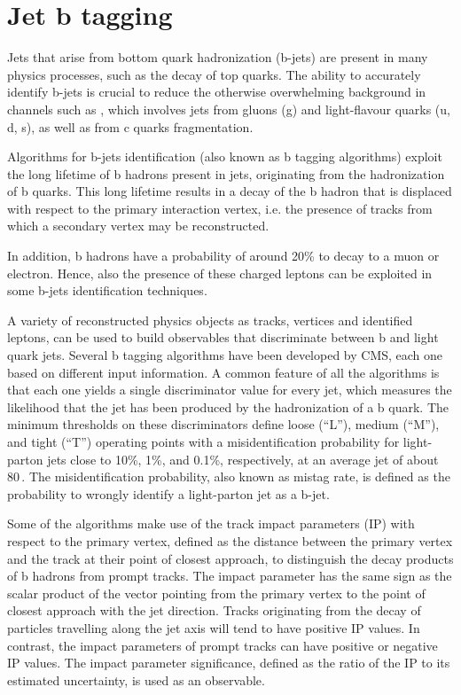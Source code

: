 \section{Jet b tagging}\label{sec:btag}

Jets that arise from bottom quark hadronization (b-jets) are present in many physics processes,
such as the decay of top quarks. The ability to accurately identify b-jets is crucial to reduce the otherwise overwhelming background in channels such as \hwwllnn, which involves jets from gluons (g) and light-flavour quarks (u, d, s), as well as from c quarks fragmentation.

Algorithms for b-jets identification (also known as b tagging algorithms) exploit the long lifetime of b hadrons present in jets, originating from the hadronization of b quarks. This long lifetime results in a decay of the b hadron that is displaced with respect to the primary interaction vertex, i.e. the presence of tracks from which a secondary vertex may be reconstructed. 

In addition, b hadrons have a probability of around 20\% to decay to a muon or electron. Hence, also the presence of these charged leptons can be exploited in some b-jets identification techniques.

A variety of reconstructed physics objects as tracks, vertices and identified leptons, can be used to build observables that discriminate between b and light quark jets. Several b tagging algorithms have been developed by CMS, each one based on different input information. A common feature of all the algorithms is that each one yields a single discriminator value for every jet, which measures the likelihood that the jet has been produced by the hadronization of a b quark. The minimum thresholds on these discriminators define loose (``L''), medium (``M''), and tight (``T'') operating points with a misidentification probability for light-parton jets close to 10\%, 1\%, and 0.1\%, respectively, at an average jet \pt of about 80\,\GeV. The misidentification probability, also known as mistag rate, is defined as the probability to wrongly identify a light-parton jet as a b-jet.

Some of the algorithms make use of the track impact parameters (IP) with respect to the primary vertex, defined as the distance between the primary vertex and the track at their point of closest approach, to distinguish the decay products of b hadrons from prompt tracks. The impact parameter has the same sign as the scalar product of the vector pointing from the primary vertex to the point of closest approach with the jet direction. Tracks originating from the decay of particles travelling along the jet axis will tend to have positive IP values. In contrast, the impact parameters of prompt tracks can have positive or negative IP values. The impact parameter significance, defined as the ratio of the IP to its estimated uncertainty, is used as an observable.

